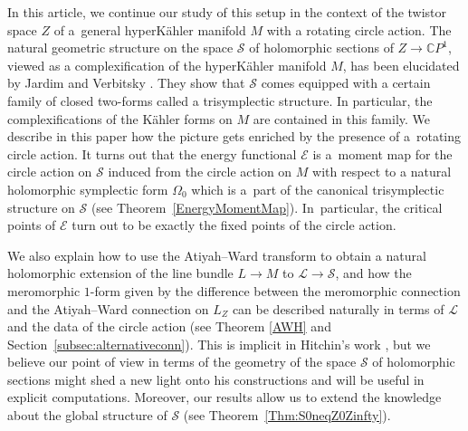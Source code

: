 \documentclass[pdftex]{sigma}
\numberwithin{equation}{section}
\theoremstyle{definition}
\newcommand\C{{\mathbb C}}
\begin{document}
In this article, we continue our study of this setup in the context of the twistor space $Z$ of a~general
hyperK\"ahler manifold $M$ with a rotating circle action. The natural geometric structure on the space $\mathcal
S$ of holomorphic sections of $Z \longrightarrow \C P^1$, viewed as a complexification of the hyperK\"ahler
manifold $M$, has been elucidated by Jardim and Verbitsky \cite{JV2,JV1}. They show that $\mathcal S$ comes
equipped with a certain family of closed two-forms called a trisymplectic structure. In particular, the
complexifications of the K\"ahler forms on $M$ are contained in this family. We describe in this paper how the
picture gets enriched by the presence of a~rotating circle action. It turns out that the energy functional
$\mathcal E$ is a~moment map for the circle action on $\mathcal S$ induced from the circle action on $M$ with
respect to a natural holomorphic symplectic form $\Omega_0$ which is a~part of the canonical trisymplectic
structure on $\mathcal S$ (see Theorem~\ref{EnergyMomentMap}). In~particular, the critical points of $\mathcal E$
turn out to be exactly the fixed points of the circle action.

We also explain how to use the Atiyah--Ward transform to obtain a natural holomorphic extension of the line
bundle $L \longrightarrow M$ to $\mathcal L \longrightarrow \mathcal S$, and how the meromorphic $1$-form given by the difference between the meromorphic connection and the Atiyah--Ward connection
on $L_Z$ can be described naturally in terms of $\mathcal L$ and the data of the circle action (see Theorem
\ref{AWH} and Section~\ref{subsec:alternativeconn}). This is implicit in Hitchin's work \cite{Hitchin-HKQK}, but we believe our point of view
in terms of the geometry of the space $\mathcal S$ of holomorphic sections might shed a new light onto his
constructions and will be useful in explicit computations. Moreover, our results allow us to extend the knowledge about the global structure of $\mathcal S$ (see
Theorem~\ref{Thm:S0neqZ0Zinfty}).
\end{document}
